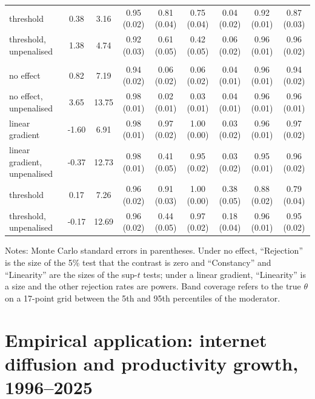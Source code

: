 \documentclass[pdflatex,sn-basic]{sn-jnl}%
\theoremstyle{thmstyleone}
\theoremstyle{thmstyletwo}
\renewenvironment{table}[1][]{\begin{tableorg}[#1]\centering\tablebodyfont}{\end{tableorg}}
\begin{document}
\begin{table}[!t]
{\begin{threeparttable}
\begin{tabular}{lcccccccc}
\quad threshold & 0.38 & 3.16 & 0.95 (0.02) & 0.81 (0.04) & 0.75 (0.04) & 0.04 (0.02) & 0.92 (0.01) & 0.87 (0.03)\\
\quad threshold, unpenalised & 1.38 & 4.74 & 0.92 (0.03) & 0.61 (0.05) & 0.42 (0.05) & 0.06 (0.02) & 0.96 (0.01) & 0.96 (0.02)\\
\addlinespace
\multicolumn{9}{l}{\textit{Moderator: Years since take-off}}\\
\quad no effect & 0.82 & 7.19 & 0.94 (0.02) & 0.06 (0.02) & 0.06 (0.02) & 0.04 (0.01) & 0.96 (0.01) & 0.94 (0.02)\\
\quad no effect, unpenalised & 3.65 & 13.75 & 0.98 (0.01) & 0.02 (0.01) & 0.03 (0.01) & 0.04 (0.01) & 0.96 (0.01) & 0.96 (0.01)\\
\quad linear gradient & -1.60 & 6.91 & 0.98 (0.01) & 0.97 (0.02) & 1.00 (0.00) & 0.03 (0.02) & 0.96 (0.01) & 0.97 (0.02)\\
\quad linear gradient, unpenalised & -0.37 & 12.73 & 0.98 (0.01) & 0.41 (0.05) & 0.95 (0.02) & 0.03 (0.02) & 0.95 (0.01) & 0.96 (0.02)\\
\quad threshold & 0.17 & 7.26 & 0.96 (0.02) & 0.91 (0.03) & 1.00 (0.00) & 0.38 (0.05) & 0.88 (0.02) & 0.79 (0.04)\\
\quad threshold, unpenalised & -0.17 & 12.69 & 0.96 (0.02) & 0.44 (0.05) & 0.97 (0.02) & 0.18 (0.04) & 0.96 (0.01) & 0.95 (0.02)\\
\bottomrule
\end{tabular}
\begin{tablenotes}\scriptsize
\item Notes: Monte Carlo standard errors in parentheses. Under no effect, ``Rejection'' is the size of the 5\% test that the contrast is zero and ``Constancy'' and ``Linearity'' are the sizes of the sup-$t$ tests; under a linear gradient, ``Linearity'' is a size and the other rejection rates are powers. Band coverage refers to the true $\theta$ on a 17-point grid between the 5th and 95th percentiles of the moderator.
\end{tablenotes}
\end{threeparttable}}
\end{table}

\section{Empirical application: internet diffusion and productivity growth, 1996--2025}\label{sec:emp}
\end{document}
